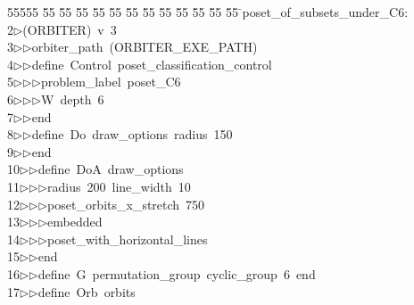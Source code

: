 %
%
\begin{tabbing}
55555 \= 55 \= 55 \= 55 \= 55 \= 55 \= 55 \= 55 \= 55 \= 55 \= 55 \= 55 \= 55 \= \>poset\_of\_subsets\_under\_C6:\\[0pt]
2\>$\triangleright$\>(ORBITER)\ v\ 3\ \\[0pt]
3\>$\triangleright$\>$\triangleright$\>orbiter\_path\ (ORBITER\_EXE\_PATH)\ \\[0pt]
4\>$\triangleright$\>$\triangleright$\>define\ Control\ poset\_classification\_control\ \\[0pt]
5\>$\triangleright$\>$\triangleright$\>$\triangleright$\>problem\_label\ poset\_C6\ \\[0pt]
6\>$\triangleright$\>$\triangleright$\>$\triangleright$\>W\ depth\ 6\ \\[0pt]
7\>$\triangleright$\>$\triangleright$\>end\ \\[0pt]
8\>$\triangleright$\>$\triangleright$\>define\ Do\ draw\_options\ radius\ 150\ \\[0pt]
9\>$\triangleright$\>$\triangleright$\>end\ \\[0pt]
10\>$\triangleright$\>$\triangleright$\>define\ DoA\ draw\_options\ \\[0pt]
11\>$\triangleright$\>$\triangleright$\>$\triangleright$\>radius\ 200\ line\_width\ 10\ \\[0pt]
12\>$\triangleright$\>$\triangleright$\>$\triangleright$\>poset\_orbits\_x\_stretch\ 750\ \\[0pt]
13\>$\triangleright$\>$\triangleright$\>$\triangleright$\>embedded\ \\[0pt]
14\>$\triangleright$\>$\triangleright$\>$\triangleright$\>poset\_with\_horizontal\_lines\ \\[0pt]
15\>$\triangleright$\>$\triangleright$\>end\ \\[0pt]
16\>$\triangleright$\>$\triangleright$\>define\ G\ permutation\_group\ cyclic\_group\ 6\ end\ \\[0pt]
17\>$\triangleright$\>$\triangleright$\>define\ Orb\ orbits\ \\[0pt]

\end{tabbing}
